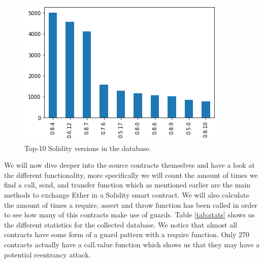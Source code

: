 \documentclass[10pt,conference]{IEEEtran}
\begin{document}
\begin{figure}[h]
  \centering
  \includegraphics[width=\linewidth]{img/versions_v3.png}
  \caption{Top-10 Solidity versions in the database.}
  \label{fig:minor-versions}
\end{figure}


We will now dive deeper into the source contracts themselves and have a look at the different functionality, more specifically we will count the amount of times we find a call, send, and transfer function which as mentioned earlier are the main methods to exchange Ether in a Solidity smart contract. We will also calculate the amount of times a require, assert and throw function has been called in order to see how many of this contracts make use of guards. Table \ref{tab:stats} shows us the different statistics for the collected database. We notice that almost all contracts have some form of a guard pattern with a require function. Only 270 contracts actually have a call.value function which shows us that they may have a potential reentrancy attack. 
\end{document}
